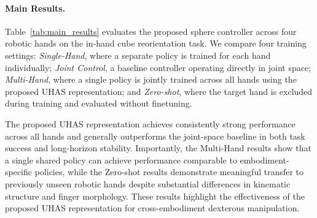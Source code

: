 \begin{table}[h]
\centering
\caption{
In-hand cube reorientation results. Metrics are reported as (Success Rate / Average Consecutive Reorientations). 
\textbf{Single-Hand}: trained only on the target hand.
\textbf{Joint Control}: baseline joint-space controller trained on the target hand.
\textbf{Multi-Hand}: trained on all four hands.
\textbf{Zero-shot}: trained on all hands except the target hand.
}
\label{tab:main_results}

\setlength{\tabcolsep}{4pt}
\vspace{-2mm}
\end{table}

\paragraph{Main Results.}
Table~\ref{tab:main_results} evaluates the proposed sphere controller across four robotic hands on the in-hand cube reorientation task. We compare four training settings: \emph{Single-Hand}, where a separate policy is trained for each hand individually; \emph{Joint Control}, a baseline controller operating directly in joint space; \emph{Multi-Hand}, where a single policy is jointly trained across all hands using the proposed UHAS representation; and \emph{Zero-shot}, where the target hand is excluded during training and evaluated without finetuning.

The proposed UHAS representation achieves consistently strong performance across all hands and generally outperforms the joint-space baseline in both task success and long-horizon stability. Importantly, the Multi-Hand results show that a single shared policy can achieve performance comparable to embodiment-specific policies, while the Zero-shot results demonstrate meaningful transfer to previously unseen robotic hands despite substantial differences in kinematic structure and finger morphology. These results highlight the effectiveness of the proposed UHAS representation for cross-embodiment dexterous manipulation.

